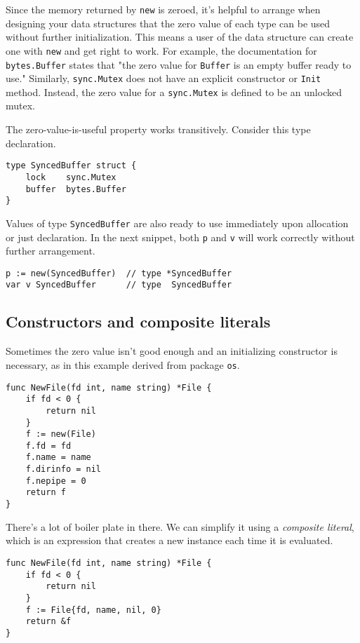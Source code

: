 Since the memory returned by \texttt{new} is zeroed, it's helpful to
arrange when designing your data structures that the zero value of each
type can be used without further initialization. This means a user of
the data structure can create one with \texttt{new} and get right to
work. For example, the documentation for \texttt{bytes.Buffer} states
that "the zero value for \texttt{Buffer} is an empty buffer ready to
use." Similarly, \texttt{sync.Mutex} does not have an explicit
constructor or \texttt{Init} method. Instead, the zero value for a
\texttt{sync.Mutex} is defined to be an unlocked mutex.

The zero-value-is-useful property works transitively. Consider this type
declaration.

\begin{Verbatim}[frame=single]
type SyncedBuffer struct {
    lock    sync.Mutex
    buffer  bytes.Buffer
}
\end{Verbatim}

Values of type \texttt{SyncedBuffer} are also ready to use immediately
upon allocation or just declaration. In the next snippet, both
\texttt{p} and \texttt{v} will work correctly without further
arrangement.

\begin{Verbatim}[frame=single]
p := new(SyncedBuffer)  // type *SyncedBuffer
var v SyncedBuffer      // type  SyncedBuffer
\end{Verbatim}

\subsection*{Constructors and composite literals}

Sometimes the zero value isn't good enough and an initializing
constructor is necessary, as in this example derived from package
\texttt{os}.

\begin{Verbatim}[frame=single]
func NewFile(fd int, name string) *File {
    if fd < 0 {
        return nil
    }
    f := new(File)
    f.fd = fd
    f.name = name
    f.dirinfo = nil
    f.nepipe = 0
    return f
}
\end{Verbatim}

There's a lot of boiler plate in there. We can simplify it using a
\emph{composite literal}, which is an expression that creates a new
instance each time it is evaluated.

\begin{Verbatim}[frame=single]
func NewFile(fd int, name string) *File {
    if fd < 0 {
        return nil
    }
    f := File{fd, name, nil, 0}
    return &f
}
\end{Verbatim}

